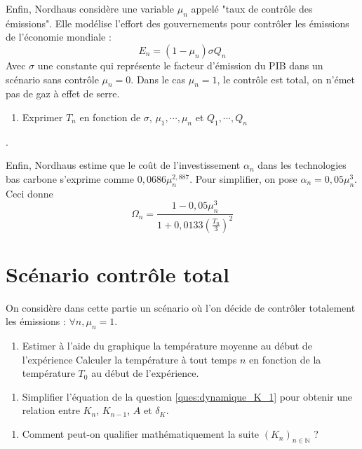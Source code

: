\documentclass[12pt]{article}
\newcommand{\ques}[1]{\begin{enumerate}[resume]
\item  #1
\end{enumerate}}
\newcommand{\rep}[1]{\textit{Réponse :} #1 \\}
\renewcommand{\rep}[1]{ }
\theoremstyle{remark}
\def\NN{\mathbb{N}}
\begin{document}
Enfin, Nordhaus considère une variable $\mu_n$ appelé "taux de contrôle des émissions".
Elle modélise l'effort des gouvernements pour contrôler les émissions de l'économie mondiale :
\begin{equation*}
E_n=(1-\mu_n)\sigma Q_n
\end{equation*}
Avec $\sigma$ une constante qui représente le facteur d'émission du PIB dans un scénario sans contrôle $\mu_n=0$. 
Dans le cas $\mu_n=1$, le contrôle est total, on n'émet pas de gaz à effet de serre.
\ques{Exprimer $T_n$ en fonction de $\sigma$, $\mu_1, \cdots, \mu_n$ et $Q_1, \cdots ,Q_n$}.
\rep{\begin{equation*}T_n= T_0+\frac{\sigma}{2000} \sum_{k=1}^n (1-\mu_k) Q_k  \end{equation*}}

Enfin, Nordhaus estime que le coût de l'investissement $\alpha_n$ dans les technologies bas carbone s'exprime comme $0,0686 \mu_n^{2,887}$. Pour simplifier, on pose $\alpha_n = 0,05\mu_n^3$. Ceci donne 
\begin{equation*}
\Omega_n = \frac{1-0,05\mu_n^3}{1+0,0133 (\frac{T_n}{3})^2}
\end{equation*}

\section{Scénario contrôle total}
On considère dans cette partie un scénario où l'on décide de contrôler totalement les émissions : $\forall n, \mu_n=1$.
\ques{Estimer à l'aide du graphique la température moyenne au début de l'expérience Calculer la température à tout temps $n$ en fonction de la température $T_0$ au début de l'expérience.}
\rep{$\forall n, T_n =T_0 = 0,8$°C.}
\ques{Simplifier l'équation de la question \ref{ques:dynamique_K_1} pour obtenir une relation entre $K_n$, $K_{n-1}$, $A$ et $\delta_K$. }
\rep{
\begin{equation*}
\forall n, \quad \Omega_n = \frac{1-0,05}{1+0,0133 (\frac{T_0}{3})}^2=\frac{0,95}{1,000945778}=0,9491
\end{equation*}
\begin{equation*}
\forall n, \quad  K_n = \frac{1- \delta_K}{1- 0,2373 A} K_{n-1}
\end{equation*}
}

\ques{Comment peut-on qualifier mathématiquement la suite $(K_n)_{n\in \NN}$ ? \label{ques:suite_geo}}
\rep{$(K_n)_{n\in \NN}$ est une suite géométrique de raison $\frac{1- \delta_K}{1- 0,2373 A}$.}
\end{document}
